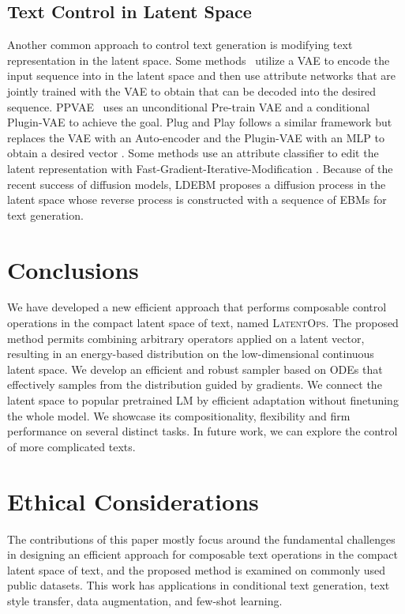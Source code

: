 \documentclass[11pt]{article}
\begin{document}
\subsection{Text Control in Latent Space}
Another common approach to control text generation is modifying text representation in the latent space. Some methods~\cite{DBLP:conf/icml/MuellerGJ17, DBLP:conf/aaai/LiuFZPL20} utilize a VAE to encode the input sequence into  in the latent space and then use attribute networks that are jointly trained with the VAE to obtain  that can be decoded into the desired sequence. 
PPVAE~\cite{DBLP:conf/acl/DuanXPHL20} uses an unconditional Pre-train VAE and a conditional Plugin-VAE to achieve the goal.
Plug and Play \cite{mai-etal-2020-plug} follows a similar framework but replaces the VAE with an Auto-encoder and the Plugin-VAE with an MLP to obtain a desired vector . Some methods use an attribute classifier to edit the latent representation  with Fast-Gradient-Iterative-Modification \cite{DBLP:conf/nips/WangH019}. Because of the recent success of diffusion models, LDEBM \cite{yulatent} proposes a diffusion process in the latent space whose reverse process is constructed with a sequence of EBMs for text generation. 













%
 \section{Conclusions}
We have developed a new efficient approach that performs composable control operations in the compact latent space of text, named \textsc{LatentOps}. 
The proposed method permits combining arbitrary operators applied on a latent vector, resulting in an energy-based distribution on the low-dimensional continuous latent space.
We develop an efficient and robust sampler based on ODEs that effectively samples from the distribution guided by gradients.
We connect the latent space to popular pretrained LM by efficient adaptation without finetuning the whole model.
We showcase its compositionality, flexibility and firm performance on several distinct tasks.
In future work, we can explore the control of more complicated texts.
 \section*{Ethical Considerations}
The contributions of this paper mostly focus around the fundamental challenges in designing an efficient approach for composable text operations in the compact latent space of text, and the proposed method is examined on commonly used public datasets. This work has applications in conditional text generation, text style transfer, data augmentation, and few-shot learning.
\end{document}
